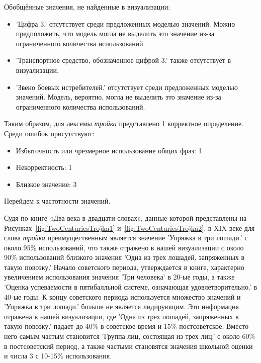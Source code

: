 \documentclass[LI,VKR]{HSEUniversity}
\begin{document}
Обобщённые значения, не найденные в визуализации:
\begin{itemize}
    \item ’Цифра 3.’ отсутствует среди предложенных моделью значений.  %
Можно предположить, что модель могла не выделить это значение из-за ограниченного количества использований.

    \item ’Транспортное средство, обозначенное цифрой 3.’ также отсутствует в визуализации.

    \item ’Звено боевых истребителей.’ отсутствует среди предложенных моделью значений.  %
Модель, вероятно, могла не выделить это значение из-за ограниченного количества использований.
\end{itemize}

Таким образом, для лексемы \textit{тройка} представлено 1 корректное определение.
Среди ошибок присутствуют:
\begin{itemize}
    \item Избыточность или чрезмерное использование общих фраз: 1
    \item Некорректность: 1
    \item Близкое значение: 3
\end{itemize}

Перейдем к частотности значений.

Судя по книге «Два века в двадцати словах»,
данные которой представлены на Рисунках~\ref{fig:TwoCenturiesTrojka1} и~\ref{fig:TwoCenturiesTrojka2}, в XIX веке для слова \textit{тройка}
преимущественным является значение ’Упряжка в три лошади.’ с около 95\% использований,
что также отражено в нашей визуализации с около 90\% использований близкого значения
’Одна из трех лошадей, запряженных в такую повозку.’
Начало советского периода, утверждается в книге, характерно увеличением использования значения
’Три человека’ в 20-ые годы, а также ’Оценка успеваемости в пятибалльной системе, означающая удовлетворительно.’
в 40-ые годы.
К концу советского периода используется множество значений и
’Упряжка в три лошади.’ больше не является
лидирующим.
Это информация отражена в нашей визуализации, где ’Одна из трех лошадей, запряженных в такую повозку.’
падает до 40\% в советское время и 15\% постсоветское.
Вместо него самым частым становится ’Группа лиц, состоящая из трех лиц.’ с около 60\%
в постсоветский период, а также частыми становятся значения школьной оценки
и числа 3 с 10-15\% использования.
\end{document}
